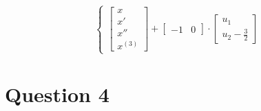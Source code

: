 \documentclass[12pt,letterpaper]{article}
\begin{document}
\begin{enumerate}[leftmargin=!,labelindent=5pt]
\begin{equation*}
\begin{cases}
            \left[\begin{matrix}x\\x'\\x''\\x^{(3)}\end{matrix}\right] + 
            \left[\begin{matrix}-1&0\end{matrix}\right] \cdot
            \left[\begin{matrix}u_1\\u_2 - \frac{3}{2}\end{matrix}\right]
         \end{cases}
     \end{equation*}
\end{enumerate}

\section*{Question 4}
\setcounter{equation}{0}
\end{document}
